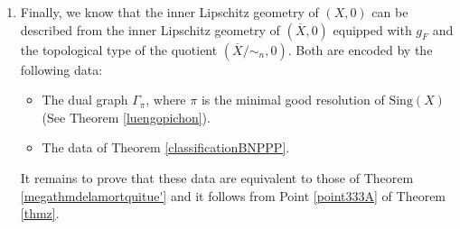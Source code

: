 \documentclass[reqno,dvipsnames,12pt]{amsart}
\begin{document}
\begin{enumerate}[label=Step \arabic*)]
    \item Finally, we know that the inner Lipschitz geometry of $(X,0)$ can be described from the inner Lipschitz geometry of $(\overline{X},0)$ equipped with $g_F$ and the topological type of the quotient $(\overline{X}/\!\sim_n,0)$. Both are encoded by the following data:
    \begin{itemize}
        \item The dual graph  $\Gamma_{\pi}$, where $\pi$ is the minimal good resolution of $\mathrm{Sing}(X)$ (See Theorem \ref{luengopichon}).
        \item The data of Theorem \ref{classificationBNPPP}.
    \end{itemize}
    It remains to prove that these data are equivalent to those of Theorem \ref{megathmdelamortquitue'} and it follows from Point \ref{point333A} of Theorem \ref{thmz}.
\end{enumerate}
\end{document}
